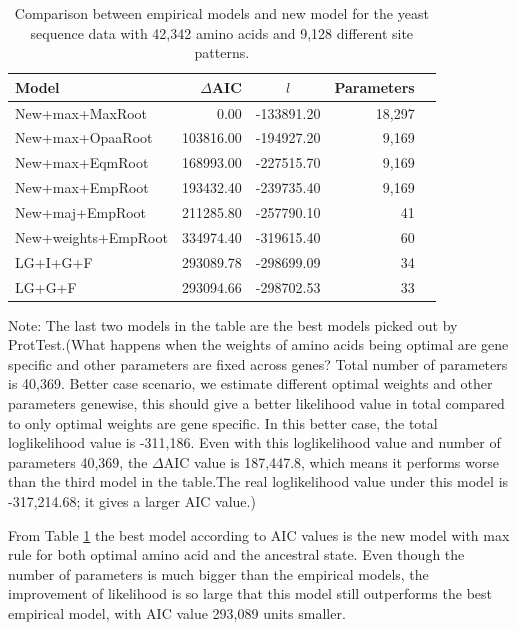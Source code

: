 \begin{table}[h]
\begin{center}
\begin{tabular}{l r c r r}
\hline
Model & $\Delta$AIC & $l$  & Parameters \\
\hline
New+max+MaxRoot & 0.00  &-133891.20 & 18,297\\
New+max+OpaaRoot & 103816.00 & -194927.20& 9,169\\
New+max+EqmRoot & 168993.00 & -227515.70 & 9,169\\
New+max+EmpRoot & 193432.40 & -239735.40  & 9,169 \\
New+maj+EmpRoot & 211285.80 & -257790.10  & 41 \\
New+weights+EmpRoot & 334974.40 & -319615.40 & 60 \\
LG+I+G+F & 293089.78 & -298699.09 & 34\\
LG+G+F & 293094.66 & -298702.53& 33 \\
\hline
\end{tabular}
\end{center}
\caption{Comparison between empirical models and new model for the yeast sequence data with 42,342 amino acids and 9,128 different site patterns.}
\label{table:mle}
\end{table}
{\color{blue} Note: The last two models in the table are the best models picked out by ProtTest.(What happens when the weights of amino acids being optimal are gene specific and other parameters are fixed across genes? Total number of parameters is 40,369.
Better case scenario, we estimate different optimal weights and other parameters genewise, this should give a better likelihood value in total compared to only optimal weights are gene specific.
In this better case, the total loglikelihood value is -311,186.
Even with this loglikelihood value and number of parameters 40,369, the $\Delta$AIC value is 187,447.8, which means it performs worse than the third model in the table.The real loglikelihood value under this model is -317,214.68; it gives a larger AIC value.)} 

From Table \ref{table:mle} the best model according to AIC values is the new model with max rule for both optimal amino acid and the ancestral state. 
Even though the number of parameters is much bigger than the empirical models, the improvement of likelihood is so large that this model still outperforms the best empirical model, with AIC value 293,089 units smaller.

